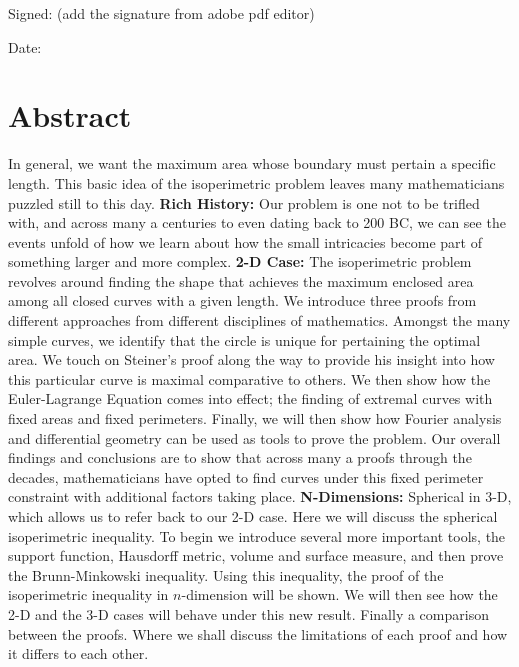 \documentclass[a4paper]{book}
\numberwithin{theorem}{section}%
\begin{document}
\bigskip

\noindent
Signed: (add the signature from adobe pdf editor)


\bigskip

\noindent
Date: 

\chapter*{Abstract}
In general, we want the maximum area whose boundary must pertain a specific length. This basic idea of the isoperimetric problem leaves many mathematicians puzzled still to this day.
\newline
\newline
\textbf{Rich History:} Our problem is one not to be trifled with, and across many a centuries to even dating back to 200 BC, we can see the events unfold of how we learn about how the small intricacies become part of something larger and more complex. 
\newline
\newline
\textbf{2-D Case:} The isoperimetric problem revolves around finding the shape that achieves the maximum enclosed area among all closed curves with a given length. We introduce three proofs from different approaches from different disciplines of mathematics. Amongst the many simple curves, we identify that the circle is unique for pertaining the optimal area. We touch on Steiner's proof along the way to provide his insight into how this particular curve is maximal comparative to others. We then show how the Euler-Lagrange Equation comes into effect; the finding of extremal curves with fixed areas and fixed perimeters. Finally, we will then show how Fourier analysis and differential geometry can be used as tools to prove the problem. Our overall findings and conclusions are to show that across many a proofs through the decades, mathematicians have opted to find curves under this fixed perimeter constraint with additional factors taking place. 
\newline
\newline
\textbf{N-Dimensions:} Spherical in 3-D, which allows us to refer back to our 2-D case. Here we will discuss the spherical isoperimetric inequality. To begin we introduce several more important tools, the support function, Hausdorff metric, volume and surface measure, and then prove the Brunn-Minkowski inequality. Using this inequality, the proof of the isoperimetric inequality in $n$-dimension will be shown. We will then see how the 2-D and the 3-D cases will behave under this new result.
\newline
\newline
Finally a comparison between the proofs. Where we shall discuss the limitations of each proof and how it differs to each other.
\end{document}
